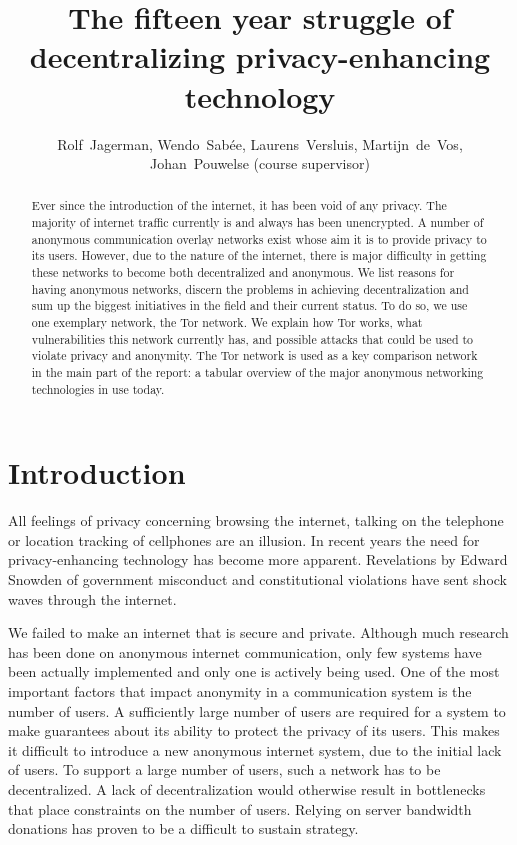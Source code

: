\documentclass[12pt,journal,compsoc]{IEEEtran}
\begin{document}


\title{The fifteen year struggle of decentralizing privacy-enhancing technology}
\author{
	Rolf~Jagerman, Wendo~Sab\'ee, Laurens~Versluis, Martijn~de~Vos,\\
	Johan~Pouwelse (course supervisor)}
\date{}

\pagestyle{empty}


\maketitle
\thispagestyle{empty}

\begin{abstract}
	Ever since the introduction of the internet, it has been void of any privacy. The majority of internet traffic currently is and always has been unencrypted. A number of anonymous communication overlay networks exist whose aim it is to provide privacy to its users. However, due to the nature of the internet, there is major difficulty in getting these networks to become both decentralized and anonymous. We list reasons for having anonymous networks, discern the problems in achieving decentralization and sum up the biggest initiatives in the field and their current status. To do so, we use one exemplary network, the Tor network. We explain how Tor works, what vulnerabilities this network currently has, and possible attacks that could be used to violate privacy and anonymity. The Tor network is used as a key comparison network in the main part of the report: a tabular overview of the major anonymous networking technologies in use today.
\end{abstract}


\section{Introduction}
	All feelings of privacy concerning browsing the internet, talking on the telephone or location tracking of cellphones are an illusion. In recent years the need for privacy-enhancing technology has become more apparent. Revelations by Edward Snowden of government misconduct and constitutional violations have sent shock waves through the internet.
	
	We failed to make an internet that is secure and private. Although much research has been done on anonymous internet communication, only few systems have been actually implemented and only one is actively being used. One of the most important factors that impact anonymity in a communication system is the number of users. A sufficiently large number of users are required for a system to make guarantees about its ability to protect the privacy of its users. This makes it difficult to introduce a new anonymous internet system, due to the initial lack of users. To support a large number of users, such a network has to be decentralized. A lack of decentralization would otherwise result in bottlenecks that place constraints on the number of users. Relying on server bandwidth donations has proven to be a difficult to sustain strategy.
	
\end{document}

